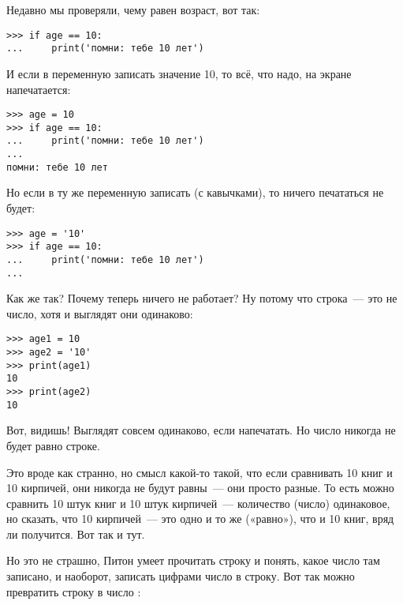 Недавно мы проверяли, чему равен возраст, вот так:

\begin{listing}
\begin{verbatim}
>>> if age == 10:
...     print('помни: тебе 10 лет')
\end{verbatim}
\end{listing}

И если в переменную  записать значение 10, то всё, что надо, на экране напечатается:

\begin{listing}
\begin{verbatim}
>>> age = 10
>>> if age == 10:
...     print('помни: тебе 10 лет')
...
помни: тебе 10 лет
\end{verbatim}
\end{listing}

Но если в ту же переменную записать  (с кавычками), то ничего печататься не будет:

\begin{listing}
\begin{verbatim}
>>> age = '10'
>>> if age == 10:
...     print('помни: тебе 10 лет')
...
\end{verbatim}
\end{listing}

Как же так? Почему теперь ничего не работает? Ну потому что строка — это не число, хотя и выглядят они одинаково:

\begin{listing}
\begin{verbatim}
>>> age1 = 10
>>> age2 = '10'
>>> print(age1)
10
>>> print(age2)
10
\end{verbatim}
\end{listing}

Вот, видишь! Выглядят совсем одинаково, если напечатать. Но число никогда не будет равно строке.

Это вроде как странно, но смысл какой-то такой, что если сравнивать 10 книг и 10 кирпичей, они никогда не будут равны — они просто разные. То есть можно сравнить 10 штук книг и 10 штук кирпичей — количество (число) одинаковое, но сказать, что 10 кирпичей — это одно и то же («равно»), что и 10 книг, вряд ли получится. Вот так и тут.

Но это не страшно, Питон умеет прочитать строку и понять, какое число там записано, и наоборот, записать цифрами число в строку. Вот так можно превратить строку  в число :

